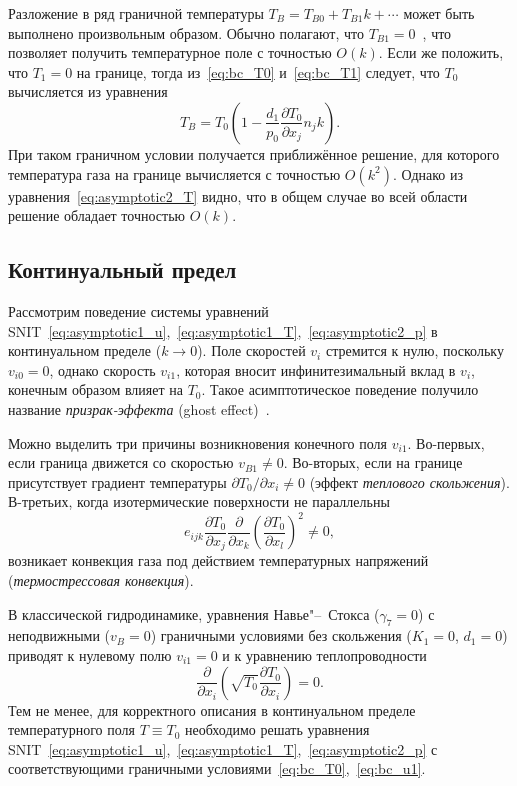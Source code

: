 \documentclass[10pt]{article}
\newcommand{\pder}[2][]{\frac{\partial#1}{\partial#2}}
\newcommand{\Pder}[2][]{\partial#1/\partial#2}
\newcommand{\OO}[1]{O(#1)}
\begin{document}
Разложение в ряд граничной температуры \(T_B = T_{B0} + T_{B1}k + \cdots\) может быть выполнено
произвольным образом. Обычно полагают, что \(T_{B1}=0\)~\cite{Kogan1976, Sone1996},
что позволяет получить температурное поле с точностью \(\OO{k}\).
Если же положить, что \(T_1=0\) на границе,
тогда из~\eqref{eq:bc_T0} и~\eqref{eq:bc_T1} следует,
что \(T_0\) вычисляется из уравнения
\begin{equation}\label{eq:boundary_temp}
    T_B = T_0 \left( 1 - \frac{d_1}{p_0}\pder[T_0]{x_j}n_j k \right).
\end{equation}
При таком граничном условии получается приближённое решение,
для которого температура газа на границе вычисляется с точностью \(\OO{k^2}\).
Однако из уравнения~\eqref{eq:asymptotic2_T} видно, что в общем случае во всей области
решение обладает точностью \(\OO{k}\).

\subsection{Континуальный предел}

Рассмотрим поведение системы уравнений SNIT~\eqref{eq:asymptotic1_u},~\eqref{eq:asymptotic1_T},~\eqref{eq:asymptotic2_p}
в континуальном пределе (\(k\to0\)).
Поле скоростей \(v_i\) стремится к нулю, поскольку \(v_{i0}=0\),
однако скорость \(v_{i1}\), которая вносит инфинитезимальный вклад в \(v_i\),
конечным образом влияет на \(T_0\).
Такое асимптотическое поведение получило название \emph{призрак-эффекта} (ghost effect)~\cite{Sone2002, Sone2007}.

Можно выделить три причины возникновения конечного поля \(v_{i1}\).
Во-первых, если граница движется со скоростью \(v_{B1}\ne0\).
Во-вторых, если на границе присутствует градиент температуры \(\Pder[T_0]{x_i}\ne0\) (эффект \emph{теплового скольжения}).
В-третьих, когда изотермические поверхности не параллельны
\begin{equation}\label{eq:nonparallel}
    e_{ijk}\pder[T_0]{x_j}\pder{x_k}\left(\pder[T_0]{x_l}\right)^2 \ne 0,
\end{equation}
возникает конвекция газа под действием температурных напряжений (\emph{термострессовая конвекция}).

В классической гидродинамике, уравнения Навье"--~Стокса (\(\gamma_7=0\))
с неподвижными (\(v_B=0\)) граничными условиями без скольжения (\(K_1=0\), \(d_1=0\))
приводят к нулевому полю \(v_{i1} = 0\) и к уравнению теплопроводности
\begin{equation}\label{eq:heat_equation}
    \pder{x_i}\left(\sqrt{T_0}\pder[T_0]{x_i}\right) = 0.
\end{equation}
Тем не менее, для корректного описания в континуальном пределе температурного поля \(T\equiv T_0\)
необходимо решать уравнения SNIT~\eqref{eq:asymptotic1_u},~\eqref{eq:asymptotic1_T},~\eqref{eq:asymptotic2_p}
с соответствующими граничными условиями~\eqref{eq:bc_T0},~\eqref{eq:bc_u1}.
\end{document}
